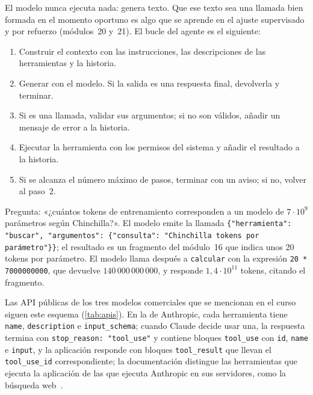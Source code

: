 El modelo nunca ejecuta nada: genera texto. Que ese texto sea una llamada bien formada en el momento oportuno es algo que se aprende en el ajuste supervisado y por refuerzo (módulos~20 y~21). El bucle del agente es el siguiente:
\begin{enumerate}[label=\arabic*.]
  \item Construir el contexto con las instrucciones, las descripciones de las herramientas y la historia.
  \item Generar con el modelo. Si la salida es una respuesta final, devolverla y terminar.
  \item Si es una llamada, validar sus argumentos; si no son válidos, añadir un mensaje de error a la historia.
  \item Ejecutar la herramienta con los permisos del sistema y añadir el resultado a la historia.
  \item Si se alcanza el número máximo de pasos, terminar con un aviso; si no, volver al paso~2.
\end{enumerate}

\begin{ejemplo}\label{ej:traza}
Pregunta: «¿cuántos tokens de entrenamiento corresponden a un modelo de $7\cdot 10^{9}$ parámetros según Chinchilla?». El modelo emite la llamada \texttt{\{"herramienta": "buscar", "argumentos": \{"consulta": "Chinchilla tokens por parámetro"\}\}}; el resultado es un fragmento del módulo~16 que indica unos 20 tokens por parámetro. El modelo llama después a \texttt{calcular} con la expresión \texttt{20 * 7000000000}, que devuelve $140\,000\,000\,000$, y responde $1{,}4\cdot 10^{11}$ tokens, citando el fragmento.
\end{ejemplo}

Las API públicas de los tres modelos comerciales que se mencionan en el curso siguen este esquema (\cref{tab:apis}). En la de Anthropic, cada herramienta tiene \texttt{name}, \texttt{description} e \texttt{input\_schema}; cuando Claude decide usar una, la respuesta termina con \texttt{stop\_reason: "tool\_use"} y contiene bloques \texttt{tool\_use} con \texttt{id}, \texttt{name} e \texttt{input}, y la aplicación responde con bloques \texttt{tool\_result} que llevan el \texttt{tool\_use\_id} correspondiente; la documentación distingue las herramientas que ejecuta la aplicación de las que ejecuta Anthropic en sus servidores, como la búsqueda web~\cite{claude-tools}.

